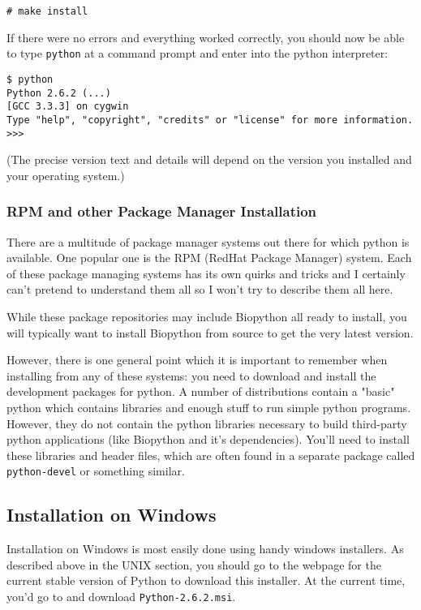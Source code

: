 \documentclass{article}
\begin{document}
\begin{verbatim}
# make install
\end{verbatim}

If there were no errors and everything worked correctly, you should now
be able to type \verb|python| at a command prompt and enter into the
python interpreter:

\begin{verbatim}
$ python
Python 2.6.2 (...)
[GCC 3.3.3] on cygwin
Type "help", "copyright", "credits" or "license" for more information.
>>>
\end{verbatim}

\noindent (The precise version text and details will depend on the version you installed and your operating system.)

\subsubsection{RPM and other Package Manager Installation}

There are a multitude of package manager systems out there for which
python is available. One popular one is the RPM (RedHat Package Manager)
system. Each of these package managing systems has its own quirks and
tricks and I certainly can't pretend to understand them all so I won't
try to describe them all here.

While these package repositories may include Biopython all ready to install,
you will typically want to install Biopython from source to get the very
latest version.

However, there is one general point which it is important to remember
when installing from any of these systems: you need to download and
install the development packages for python. A number of distributions
contain a "basic" python which contains libraries and enough stuff to
run simple python programs. However, they do not contain the python
libraries necessary to build third-party python applications (like
Biopython and it's dependencies). You'll need to install these libraries
and header files, which are often found in a separate package called
\verb|python-devel| or something similar. 

\subsection{Installation on Windows} 

Installation on Windows is most easily done using handy windows
installers. As described above in the UNIX section, you should go to the
webpage for the current stable version of Python to download this
installer. At the current time, you'd go to
 and download
\verb|Python-2.6.2.msi|. 
\end{document}
